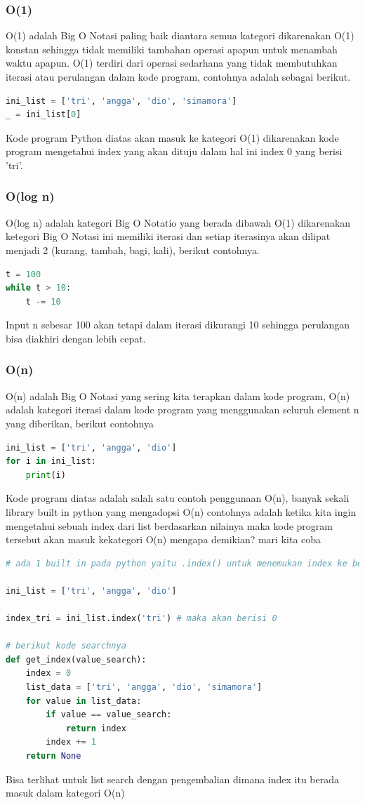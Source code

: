 \subsubsection{O(1)}
O(1) adalah Big O Notasi paling baik diantara semua kategori dikarenakan O(1) konstan sehingga tidak memiliki tambahan operasi apapun untuk menambah waktu apapun. O(1) terdiri dari operasi sedarhana yang tidak membutuhkan iterasi atau perulangan dalam kode program, contohnya adalah sebagai berikut.
\begin{lstlisting}[language=Python]
ini_list = ['tri', 'angga', 'dio', 'simamora']
_ = ini_list[0]
\end{lstlisting}
Kode program Python diatas akan masuk ke kategori O(1) dikarenakan kode program mengetahui index yang akan dituju dalam hal ini index 0 yang berisi 'tri'.

\subsubsection{O(log n)}
O(log n) adalah kategori Big O Notatio yang berada dibawah O(1) dikarenakan ketegori Big O Notasi ini memiliki iterasi dan setiap iterasinya akan dilipat menjadi 2 (kurang, tambah, bagi, kali), berikut contohnya.
\begin{lstlisting}[language=Python]
t = 100
while t > 10:
    t -= 10
\end{lstlisting}
Input n sebesar 100 akan tetapi dalam iterasi dikurangi 10 sehingga perulangan bisa diakhiri dengan lebih cepat.

\subsubsection{O(n)}
O(n) adalah Big O Notasi yang sering kita terapkan dalam kode program, O(n) adalah kategori iterasi dalam kode program yang menggunakan seluruh element n yang diberikan, berikut contohnya
\begin{lstlisting}[language=Python]
ini_list = ['tri', 'angga', 'dio']
for i in ini_list:
    print(i)
\end{lstlisting}
Kode program diatas adalah salah satu contoh penggunaan O(n), banyak sekali library built in python yang mengadopsi O(n) contohnya adalah ketika kita ingin mengetahui sebuah index dari list berdasarkan nilainya maka kode program tersebut akan masuk kekategori O(n) mengapa demikian? mari kita coba
\begin{lstlisting}[language=Python]
# ada 1 built in pada python yaitu .index() untuk menemukan index ke berapa berdasarkan nilai, mari kita bedah mengapa bisa masuk kategori O(n)

ini_list = ['tri', 'angga', 'dio']

index_tri = ini_list.index('tri') # maka akan berisi 0

# berikut kode searchnya
def get_index(value_search):
    index = 0
    list_data = ['tri', 'angga', 'dio', 'simamora']
    for value in list_data:
        if value == value_search:
            return index
        index += 1
    return None
\end{lstlisting}
Bisa terlihat untuk list search dengan pengembalian dimana index itu berada masuk dalam kategori O(n)

